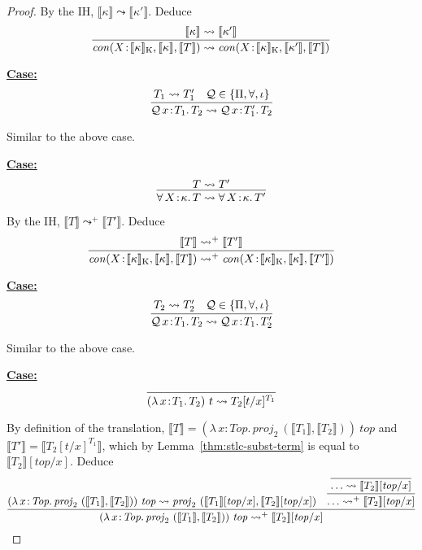 \documentclass{article}
\newcommand{\abs}[4]{{#1}\, #2\! : \! #3.\, #4}
\newcommand{\interp}[1]{\llbracket #1 \rrbracket}
\newcommand{\startcase}[1]{\vspace{#1} \noindent\textbf{\underline{Case:}}}
\begin{document}
\begin{proof}
  By the IH, \(\interp{\kappa} \leadsto \interp{\kappa'}\).
  Deduce
  \[
    \infer{
      \mathit{con}(X\!:\!\interp{\kappa}_{\text{K}},\interp{\kappa},\interp{T})
      \leadsto \mathit{con}(X\!:\!\interp{\kappa}_{\text{K}},\interp{\kappa'},\interp{T})
    }{
      \interp{\kappa} \leadsto \interp{\kappa'}
    }
  \]

  \startcase{.2cm}
  \[
    \infer{
      \abs{\mathcal{Q}}{x}{T_1}{T_2}
      \leadsto
      \abs{\mathcal{Q}}{x}{T_1'}{T_2}
    }{
      T_1 \leadsto T_1'
      & \mathcal{Q} \in \{\Pi,\forall,\iota\}
    }
  \]

  Similar to the above case.
  
  \startcase{.2cm}
  \[
    \infer{
      \abs{\forall}{X}{\kappa}{T} \leadsto \abs{\forall}{X}{\kappa}{T'}
    }{
      T \leadsto T'
    }
  \]

  By the IH, \(\interp{T} \leadsto^+ \interp{T'}\).
  Deduce
  \[
    \infer{
      \mathit{con}(X\!:\!\interp{\kappa}_{\text{K}},\interp{\kappa},\interp{T})
      \leadsto^+
      \mathit{con}(X\!:\!\interp{\kappa}_{\text{K}},\interp{\kappa},\interp{T'})
    }{
      \interp{T} \leadsto^+ \interp{T'}
    }
  \]

  \startcase{.2cm}
  \[
    \infer{
      \abs{\mathcal{Q}}{x}{T_1}{T_2} \leadsto \abs{\mathcal{Q}}{x}{T_1}{T_2'}
    }{
      T_2 \leadsto T_2'
      & \mathcal{Q} \in \{\Pi,\forall,\iota\}
    }
  \]  

  Similar to the above case.

  \startcase{.2cm}
  \[
    \infer{
      (\abs{\lambda}{x}{T_1}{T_2})\ t \leadsto T_2 [t/x]^{T_1}
    }{}
  \]

  By definition of the translation, \(\interp{T} =
  (\abs{\lambda}{x}{\mathit{Top}}{\mathit{proj}_2\
    (\interp{T_1},\interp{T_2})})\ \mathit{top}\) and 
  \(\interp{T'} = \interp{T_2[t/x]^{T_1}}\), which by
  Lemma~\ref{thm:stlc-subst-term} is equal to \(\interp{T_2}[\mathit{top}/x]\).
  Deduce
  \[
    \infer{
      (\abs{\lambda}{x}{\mathit{Top}}{\mathit{proj}_2\ (\interp{T_1},\interp{T_2})})\ \mathit{top}
      \leadsto^+ \interp{T_2}[\mathit{top}/x]
    }{
      (\abs{\lambda}{x}{\mathit{Top}}{\mathit{proj}_2\ (\interp{T_1},\interp{T_2})})\ \mathit{top}
      \leadsto
      \mathit{proj}_2\
      (\interp{T_1}[\mathit{top}/x],\interp{T_2}[\mathit{top}/x])
      &
      \infer{
        \ldots
        \leadsto^+
        \interp{T_2}[\mathit{top}/x]
      }{
        \infer{
          \ldots \leadsto \interp{T_2}[\mathit{top}/x]
        }{}
      }
    }
  \]



\end{proof}
\end{document}
